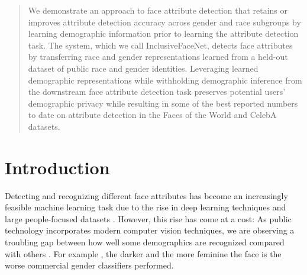 \documentclass{article}
\begin{document}
\begin{abstract}

We demonstrate an approach to face attribute detection that retains or improves attribute detection accuracy across gender and race subgroups by learning demographic information prior to learning the attribute detection task. The system, which we call InclusiveFaceNet, detects face attributes by transferring race and gender representations learned from a held-out dataset of public race and gender identities. Leveraging learned demographic representations while withholding demographic inference from the downstream face attribute detection task preserves potential users' demographic privacy while resulting in some of the best reported numbers to date on attribute detection in the Faces of the World and CelebA datasets.\vspace{-.7em}

\end{abstract}

\section{Introduction}

Detecting and recognizing different face attributes has become an increasingly feasible machine learning task due to the rise in deep learning techniques and large people-focused datasets \cite{Niu_2016_CVPR,liuetal2015celeba}. However, this rise has come at a cost:  As public technology incorporates modern computer vision techniques, we are observing a troubling gap between how well some demographics are recognized compared with others \cite{whitehouse2016bigdata}.
For example \cite{gendershades}, the darker and the more feminine the face is the worse commercial gender classifiers performed.
\end{document}
